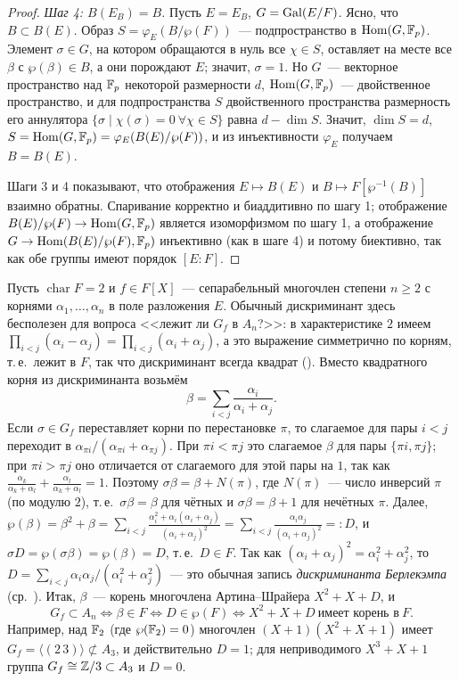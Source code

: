 \begin{proof}
\emph{Шаг 4: $B(E_B)=B$.} Пусть $E=E_B$, $G=\operatorname{Gal}(E/F)$. Ясно, что $B\subset B(E)$. Образ $S=\varphi_E(B/\wp(F))$~---
подпространство в $\operatorname{Hom}(G,\mathbb F_p)$. Элемент $\sigma\in G$, на котором обращаются в нуль все $\chi\in S$, оставляет на месте
все $\beta$ с $\wp(\beta)\in B$, а они порождают $E$; значит, $\sigma=1$. Но $G$~--- векторное пространство над $\mathbb F_p$
некоторой размерности $d$, $\operatorname{Hom}(G,\mathbb F_p)$~--- двойственное пространство, и для подпространства $S$ двойственного
пространства размерность его аннулятора $\{\sigma\mid\chi(\sigma)=0\ \forall\chi\in S\}$ равна $d-\dim S$. Значит, $\dim S=d$,
$S=\operatorname{Hom}(G,\mathbb F_p)=\varphi_E(B(E)/\wp(F))$, и из инъективности $\varphi_E$ получаем $B=B(E)$.

Шаги 3 и 4 показывают, что отображения $E\mapsto B(E)$ и $B\mapsto F[\wp^{-1}(B)]$ взаимно обратны. Спаривание
корректно и биаддитивно по шагу 1; отображение $B(E)/\wp(F)\to\operatorname{Hom}(G,\mathbb F_p)$ является изоморфизмом по шагу 1, а
отображение $G\to\operatorname{Hom}(B(E)/\wp(F),\mathbb F_p)$ инъективно (как в шаге 4) и потому биективно, так как обе группы имеют порядок
$[E:F]$.
\end{proof}

\begin{example}
Пусть $\operatorname{char}F=2$ и $f\in F[X]$~--- сепарабельный многочлен степени $n\ge2$ с корнями $\alpha_1,\dots,\alpha_n$
в поле разложения $E$. Обычный дискриминант здесь бесполезен для вопроса <<лежит ли $G_f$ в $A_n$?>>: в характеристике $2$
имеем $\prod_{i<j}(\alpha_i-\alpha_j)=\prod_{i<j}(\alpha_i+\alpha_j)$, а это выражение симметрично по корням, т.\,е.\ лежит в
$F$, так что дискриминант всегда квадрат (). Вместо квадратного корня из дискриминанта возьмём
\[
\beta=\sum_{i<j}\frac{\alpha_i}{\alpha_i+\alpha_j}.
\]
Если $\sigma\in G_f$ переставляет корни по перестановке $\pi$, то слагаемое для пары $i<j$ переходит в
$\alpha_{\pi i}/(\alpha_{\pi i}+\alpha_{\pi j})$. При $\pi i<\pi j$ это слагаемое $\beta$ для пары $\{\pi i,\pi j\}$; при
$\pi i>\pi j$ оно отличается от слагаемого для этой пары на $1$, так как
$\frac{\alpha_k}{\alpha_k+\alpha_l}+\frac{\alpha_l}{\alpha_k+\alpha_l}=1$. Поэтому $\sigma\beta=\beta+N(\pi)$, где $N(\pi)$~---
число инверсий $\pi$ (по модулю $2$), т.\,е.\ $\sigma\beta=\beta$ для чётных и $\sigma\beta=\beta+1$ для нечётных $\pi$.
Далее, $\wp(\beta)=\beta^2+\beta=\sum_{i<j}\frac{\alpha_i^2+\alpha_i(\alpha_i+\alpha_j)}{(\alpha_i+\alpha_j)^2}
=\sum_{i<j}\frac{\alpha_i\alpha_j}{(\alpha_i+\alpha_j)^2}=:D$, и $\sigma D=\wp(\sigma\beta)=\wp(\beta)=D$, т.\,е.\ $D\in F$.
Так как $(\alpha_i+\alpha_j)^2=\alpha_i^2+\alpha_j^2$, то $D=\sum_{i<j}\alpha_i\alpha_j/(\alpha_i^2+\alpha_j^2)$~--- это обычная
запись \emph{дискриминанта Берлекэмпа} (ср.\ ). Итак, $\beta$~--- корень многочлена Артина--Шрайера $X^2+X+D$, и
\[
G_f\subset A_n\iff\beta\in F\iff D\in\wp(F)\iff X^2+X+D\ \text{имеет корень в}\ F.
\]
Например, над $\mathbb F_2$ (где $\wp(\mathbb F_2)=0$) многочлен $(X+1)(X^2+X+1)$ имеет $G_f=\langle(2\,3)\rangle\not\subset A_3$, и
действительно $D=1$; для неприводимого $X^3+X+1$ группа $G_f\cong\mathbb Z/3\subset A_3$ и $D=0$.
\end{example}

